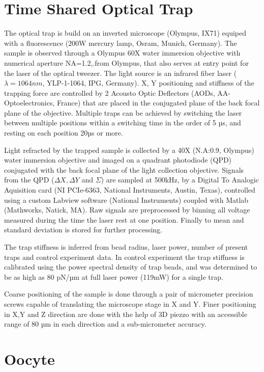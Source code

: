 \documentclass[A4paperpaper,11pt,english]{sphinxmanual}
\begin{document}
\section{Time Shared Optical Trap}
\label{parts/part2:time-shared-optical-trap}\label{parts/part2:time-shared-ot}
The optical trap is build on an inverted microscope (Olympus, IX71) equiped with
a fluorescence (200W mercury lamp, Osram, Munich, Germany). The sample is observed
through a Olympus 60X water immersion objective with numerical aperture NA=1.2,.from Olympus, that also
serves at entry point for the laser of the optical tweezer.  The light source is
an infrared fiber laser (\(\lambda=1064nm\), YLP-1-1064, IPG,
Germany). X, Y positioning and stiffness of the trapping force are controlled
by 2 Acousto Optic Deflectors (AODs, AA-Optoelectronics, France) that are placed  in the conjugated plane of
the back focal plane of the objective.
Multiple traps can be achieved by switching the laser between
multiple positions within a switching time in the order of 5 µs, and resting
on each position 20µs or more.

Light refracted by the trapped sample is collected by a 40X (N.A:0.9, Olympus)
water immersion objective and imaged on a quadrant photodiode (QPD) conjugated
with the back focal plane of the light collection objective. Signals from the
QPD (\(\Delta X, \Delta Y\) and \(\Sigma\)) are sampled at 500kHz, by a Digital
To Analogic Aquisition card (NI PCIe-6363, National Instruments, Austin,
Texas), controlled using a custom Labview software (National Instruments)
coupled with Matlab (Mathworks, Natick, MA). Raw signals are preprocessed by binning all voltage measured during the time the laser rest at one position. Finally
to mean and standard deviation is stored for further processing.

The trap stiffness is inferred from bead radius, laser power, number of present
traps and control experiment data. In control experiment the trap stiffness is
calibrated using the power spectral density of trap beads, and was determined
to be as high as 80 pN/µm at full laser power (119mW) for a single trap.

Coarse positioning of the sample is done through a pair of micrometer precision
screws capable of translating the microscope stage in X and Y.  Finer
positioning in X,Y and Z direction are done with the help of 3D piezzo with an
accessible range of 80 µm in each direction and a sub-micrometer accuracy.


\section{Oocyte}
\label{parts/part2:oocyte}
\end{document}
